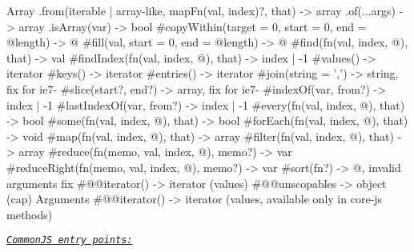 \begin{DoxyCode}
Array
  .from(iterable | array-like, mapFn(val, index)?, that) -> array
  .of(...args)                                           -> array
  .isArray(var)                                          -> bool
  #copyWithin(target = 0, start = 0, end = @length)      -> @
  #fill(val, start = 0, end = @length)                   -> @
  #find(fn(val, index, @), that)                         -> val
  #findIndex(fn(val, index, @), that)                    -> index | -1
  #values()                                              -> iterator
  #keys()                                                -> iterator
  #entries()                                             -> iterator
  #join(string = ',')                                    -> string, fix for ie7-
  #slice(start?, end?)                                   -> array, fix for ie7-
  #indexOf(var, from?)                                   -> index | -1
  #lastIndexOf(var, from?)                               -> index | -1
  #every(fn(val, index, @), that)                        -> bool
  #some(fn(val, index, @), that)                         -> bool
  #forEach(fn(val, index, @), that)                      -> void
  #map(fn(val, index, @), that)                          -> array
  #filter(fn(val, index, @), that)                       -> array
  #reduce(fn(memo, val, index, @), memo?)                -> var
  #reduceRight(fn(memo, val, index, @), memo?)           -> var
  #sort(fn?)                                             -> @, invalid arguments fix
  #@@iterator()                                          -> iterator (values)
  #@@unscopables                                         -> object (cap)
Arguments
  #@@iterator() -> iterator (values, available only in core-js methods)
\end{DoxyCode}
 \href{#commonjs}{\tt {\itshape Common\+JS entry points\+:}} 

